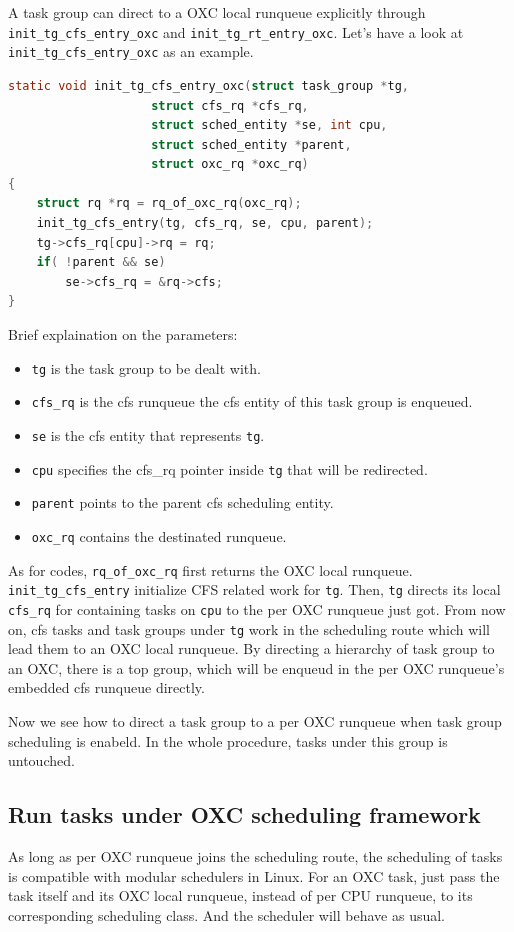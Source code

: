 A task group can direct to a OXC local runqueue explicitly through 
\texttt{init\_tg\_cfs\_entry\_oxc} and \texttt{init\_tg\_rt\_entry\_oxc}.
Let's have a look at \texttt{init\_tg\_cfs\_entry\_oxc} as an example.
\begin{lstlisting}[language=C, caption={To explicitlt direct a task group 
						to an OXC local runqueue}]
static void init_tg_cfs_entry_oxc(struct task_group *tg,
					struct cfs_rq *cfs_rq,
					struct sched_entity *se, int cpu,
					struct sched_entity *parent,
					struct oxc_rq *oxc_rq)
{
	struct rq *rq = rq_of_oxc_rq(oxc_rq);
	init_tg_cfs_entry(tg, cfs_rq, se, cpu, parent);
	tg->cfs_rq[cpu]->rq = rq;
	if( !parent && se)
		se->cfs_rq = &rq->cfs;
} 
\end{lstlisting}
Brief explaination on the parameters:
\begin{itemize}
\item \texttt{tg} is the task group to be dealt with.
\item \texttt{cfs\_rq} is the cfs runqueue the cfs entity of this task
		group is enqueued. 
\item \texttt{se} is the cfs entity that represents \texttt{tg}.
\item \texttt{cpu} specifies the cfs\_rq pointer inside \texttt{tg} that
		will be redirected.
\item \texttt{parent} points to the parent cfs scheduling entity.
\item \texttt{oxc\_rq} contains the destinated runqueue. 
\end{itemize}
As for codes, \texttt{rq\_of\_oxc\_rq} first returns the OXC local runqueue.
\texttt{init\_tg\_cfs\_entry} initialize CFS related work for \texttt{tg}.
Then, \texttt{tg} directs its local \texttt{cfs\_rq} for containing 
tasks on \texttt{cpu} to the per OXC runqueue just got. From now on, cfs 
tasks and task groups under \texttt{tg} work in the scheduling route which
will lead them to an OXC local runqueue. By directing a hierarchy of task
group to an OXC, there is a top group, which will be enqueud in the per
OXC runqueue's embedded cfs runqueue directly.

Now we see how to direct a task group to a per OXC runqueue when task group
scheduling is enabeld. In the whole procedure, tasks under this group is 
untouched.

\subsection{Run tasks under OXC scheduling framework}
As long as per OXC runqueue joins the scheduling route, the scheduling 
of tasks is compatible with modular schedulers in Linux. For an OXC task,
just pass the task itself and its OXC local runqueue, instead of per CPU
runqueue, to its corresponding scheduling class. And the scheduler will
behave as usual.

